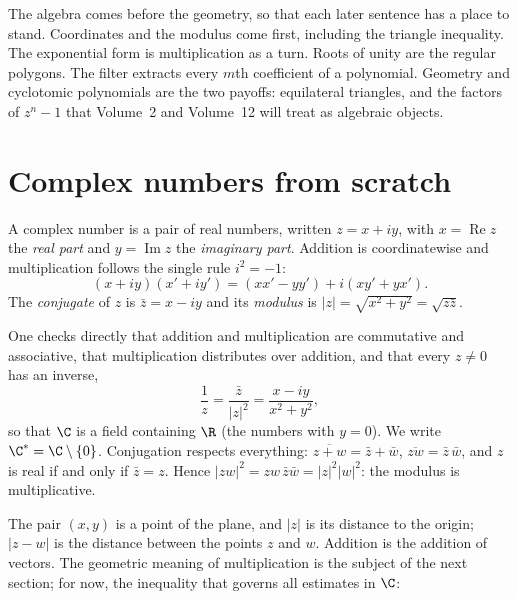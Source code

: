 The algebra comes before the geometry, so that each later sentence has a place to stand. Coordinates and the modulus come first, including the triangle inequality. The exponential form is multiplication as a turn. Roots of unity are the regular polygons. The filter extracts every $m$th coefficient of a polynomial. Geometry and cyclotomic polynomials are the two payoffs: equilateral triangles, and the factors of $z^n-1$ that Volume~2 and Volume~12 will treat as algebraic objects.


\section{Complex numbers from scratch}

\begin{definitionx}
A complex number is a pair of real numbers, written $z=x+iy$, with $x=\operatorname{Re}z$ the \emph{real part} and $y=\operatorname{Im}z$ the
\emph{imaginary part}. Addition is coordinatewise and multiplication follows the single rule $i^2=-1$:
\[
(x+iy)(x'+iy')=(xx'-yy')+i(xy'+yx').
\]
The \emph{conjugate} of $z$ is $\bar z=x-iy$ and its \emph{modulus} is $|z|=\sqrt{x^2+y^2}=\sqrt{z\bar z}$.
\end{definitionx}

One checks directly that addition and multiplication are commutative and associative, that multiplication distributes over addition, and that
every $z\ne0$ has an inverse,
\[
\frac1z=\frac{\bar z}{|z|^2}=\frac{x-iy}{x^2+y^2},
\]
so that $\C$ is a field containing $\R$ (the numbers with $y=0$). We write $\C^*=\C\setminus\{0\}$. Conjugation respects everything: $\overline{z+w}=\bar z+\bar w$,
$\overline{zw}=\bar z\,\bar w$, and $z$ is real if and only if $\bar z=z$. Hence $|zw|^2=zw\,\bar z\bar w=|z|^2|w|^2$: the modulus is multiplicative.

The pair $(x,y)$ is a point of the plane, and $|z|$ is its distance to the origin; $|z-w|$ is the distance between the points $z$ and $w$.
Addition is the addition of vectors. The geometric meaning of multiplication is the subject of the next section; for now, the inequality that
governs all estimates in $\C$:

